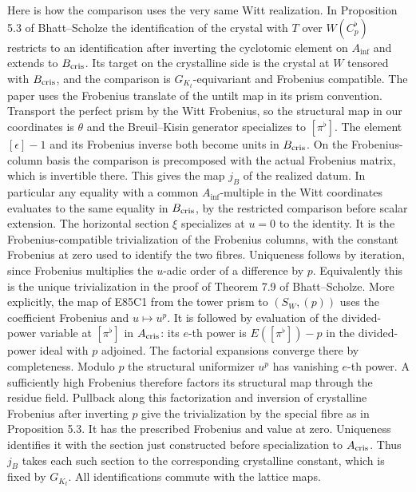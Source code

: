 Here is how the comparison uses the very same Witt realization.
In Proposition 5.3 of Bhatt--Scholze the identification of the
crystal with $T$ over $W(C_p^\flat)$ restricts to an identification
after inverting the cyclotomic element on $A_{\inf}$ and extends
to $B_{\rm cris}$. Its target on the crystalline side is the
crystal at $W$ tensored with $B_{\rm cris}$, and the comparison
is $G_{K_t}$-equivariant and Frobenius compatible. The paper uses
the Frobenius translate of the untilt map in its prism convention.
Transport the perfect prism by the Witt Frobenius, so the structural
map in our coordinates is $\theta$ and the Breuil--Kisin generator
specializes to $[\pi^\flat]$. The element $[\epsilon]-1$ and its
Frobenius inverse both become units in $B_{\rm cris}$. On the
Frobenius-column basis the comparison is precomposed with the actual
Frobenius matrix, which is invertible there. This gives the map $j_B$
of the realized datum. In particular any equality with a common
$A_{\inf}$-multiple in the Witt coordinates evaluates to the same
equality in $B_{\rm cris}$, by the restricted comparison before
scalar extension. The horizontal section $\xi$ specializes at
$u=0$ to the identity. It is the Frobenius-compatible trivialization
of the Frobenius columns, with the constant Frobenius at zero used
to identify the two fibres. Uniqueness follows by iteration, since
Frobenius multiplies the $u$-adic order of a difference by $p$.
Equivalently this is the unique trivialization in the proof of
Theorem 7.9 of Bhatt--Scholze. More explicitly, the map of E85C1 from the tower prism to
$(S_W,(p))$ uses the coefficient Frobenius and $u\mapsto u^p$.
It is followed by evaluation of the divided-power variable at
$[\pi^\flat]$ in $A_{\rm cris}$: its $e$-th power is
$E([\pi^\flat])-p$ in the divided-power ideal with $p$ adjoined.
The factorial expansions converge there by completeness. Modulo
$p$ the structural uniformizer $u^p$ has vanishing $e$-th power.
A sufficiently high Frobenius therefore factors its structural
map through the residue field. Pullback along this factorization
and inversion of crystalline Frobenius after inverting $p$ give
the trivialization by the special fibre as in Proposition 5.3.
It has the prescribed Frobenius and value at zero. Uniqueness
identifies it with the section just constructed before specialization
to $A_{\rm cris}$. Thus $j_B$ takes each such section
to the corresponding crystalline constant, which is fixed by
$G_{K_t}$. All identifications commute with the lattice maps.

